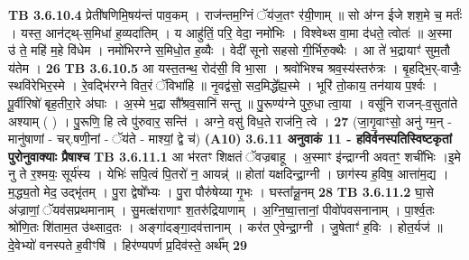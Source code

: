 \documentclass[17pt]{extarticle}
\begin{document}
{{{{{{{{{{{{{{{{{{{                  \newline
                                \textbf{ TB 3.6.10.4} \newline
                  प्रेती॑षणिमि॒षय॑न्तं पाव॒कम् । राज॑न्तम॒ग्निं ॅय॑ज॒तꣳ र॑यी॒णाम् ॥ सो अ॑ग्न ईजे शश॒मे च॒ मर्तः॑ । यस्त॒ आन॑ट्थ्-स॒मिधा॑ ह॒व्यदा॑तिम् । य आहु॑तिं॒ परि॒ वेदा॒ नमो॑भिः । विश्वेथ्स वा॒मा द॑धते॒ त्वोतः॑ ॥ अ॒स्मा उ॑ ते॒ महि॑ म॒हे वि॑धेम । नमो॑भिरग्ने स॒मिधो॒त ह॒व्यैः । वेदी॑ सूनो सहसो गी॒र्भिरु॒क्थैः । आ ते॑ भ॒द्रायाꣳ॑ सुम॒तौ य॑तेम । \textbf{ 26} \newline
                  \newline
                                \textbf{ TB 3.6.10.5} \newline
                  आ यस्त॒तन्थ॒ रोद॑सी॒ वि भा॒सा । श्रवो॑भिश्च श्रव॒स्य॑स्तरु॑त्रः । बृ॒हद्भि॒र्-वाजैः॒ स्थवि॑रेभिर॒स्मे । रे॒वद्भि॑रग्ने वित॒रं ॅविभा॑हि ॥ नृ॒वद्व॑सो॒ सद॒मिद्धे᳚ह्य॒स्मे । भूरि॑ तो॒काय॒ तन॑याय प॒र्श्वः । पू॒र्वीरिषो॑ बृह॒तीरा॒रे अ॑घाः । अ॒स्मे भ॒द्रा सौ᳚श्रव॒सानि॑ सन्तु ॥ पु॒रूण्य॑ग्ने पुरु॒धा त्वा॒या । वसू॑नि राजन्-व॒सुता॑ते अश्याम् ( ) । पु॒रूणि॒ हि त्वे पु॑रुवार॒ सन्ति॑ । अग्ने॒ वसु॑ विध॒ते राज॑नि॒ त्वे । \textbf{ 27} \newline
                  \newline
                                    (जा॒गृ॒वाꣳसो॒ अनु॑ ग्म॒न् - मानु॑षाणां - चर्.षणी॒नां - ॅय॑ते - माश्यां॒ द्वे च॑) \textbf{(A10)} \newline \newline
                \textbf{ 3.6.11    अनुवाकं   11 - हविर्वनस्पतिस्विष्टकृतां पुरोनुवाक्याः प्रैषाश्च} \newline
                                \textbf{ TB 3.6.11.1} \newline
                  आ भ॑रतꣳ शिक्षतं ॅवज्रबाहू । अ॒स्माꣳ इ॑न्द्राग्नी अवतꣳ॒॒ शची॑भिः ।इ॒मे नु ते र॒श्मयः॒ सूर्य॑स्य । येभिः॑ सपि॒त्वं पि॒तरो॑ न॒ आयन्न्॑ ॥ होता॑ यक्षदिन्द्रा॒ग्नी । छाग॑स्य ह॒विष॒ आत्ता॑म॒द्य । म॒द्ध्य॒तो मेद॒ उद्भृ॑तम् । पु॒रा द्वेषो᳚भ्यः । पु॒रा पौरु॑षेय्या गृ॒भः । घस्ता᳚न्नू॒नम् \textbf{ 28} \newline
                  \newline
                                \textbf{ TB 3.6.11.2} \newline
                  घा॒से अ॑ज्राणां॒ ॅयव॑सप्रथमानाम् । सु॒मत्क्ष॑राणाꣳ श॒तरु॑द्रियाणाम् । अ॒ग्नि॒ष्वा॒त्तानां॒ पीवो॑पवसनानाम् । पा॒र्श्व॒तः श्रो॑णि॒तः शि॑ताम॒त उ॑थ्साद॒तः । अङ्गा॑दङ्गा॒दव॑त्तानाम् । कर॑त ए॒वेन्द्रा॒ग्नी । जु॒षेताꣳ॑ ह॒विः । होत॒र्यज॑ ॥ दे॒वेभ्यो॑ वनस्पते ह॒वीꣳषि॑ । हिर॑ण्यपर्ण प्र॒दिव॑स्ते॒ अर्थ᳚म् \textbf{ 29} \newline
}}}}}}}}}}}}}}}}}}}
\end{document}
